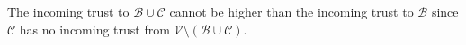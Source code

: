 \begin{proofsketch}
  The incoming trust to $\mathcal{B} \cup \mathcal{C}$ cannot be higher than the incoming trust to $\mathcal{B}$ since
  $\mathcal{C}$ has no incoming trust from $\mathcal{V} \setminus \left(\mathcal{B} \cup \mathcal{C}\right)$.
\end{proofsketch}
